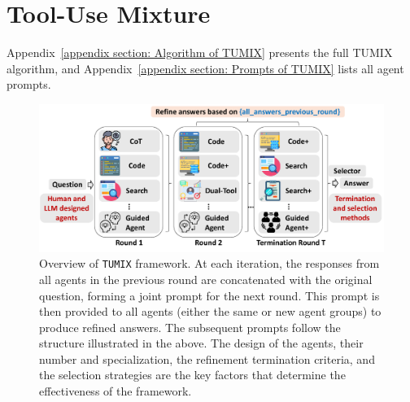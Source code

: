 \section{Tool-Use Mixture}
\label{sec:Tool-Use Mixture (TUMIX) and Problem Formalization}
Appendix~\ref{appendix section: Algorithm of TUMIX} presents the full TUMIX algorithm, and Appendix~\ref{appendix section: Prompts of TUMIX} lists all agent prompts.

\begin{figure}[ht]
  \centering
  \includegraphics[width=0.95\linewidth]{Figures/Method.pdf}
   \caption{Overview of \texttt{TUMIX} framework. At each iteration, the responses from all agents in the previous round are concatenated with the original question, forming a joint prompt for the next round. This prompt is then provided to all agents (either the same or new agent groups) to produce refined answers. The subsequent prompts follow the structure illustrated in the above. The design of the agents, their number and specialization, the refinement termination criteria, and the selection strategies are the key factors that determine the effectiveness of the framework.}
   \label{fig:method_TUMIX}
   \vspace{-6pt}
\end{figure}

